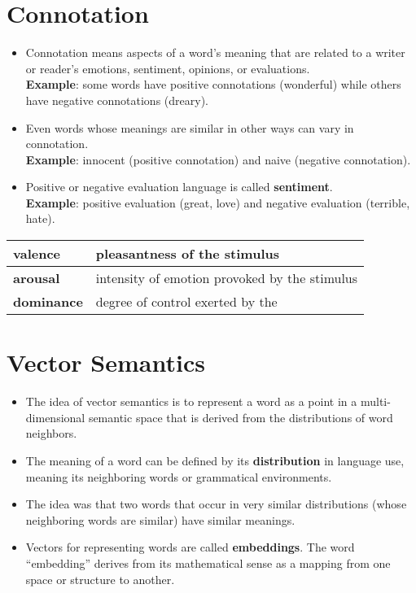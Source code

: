 \section{Connotation \cite{nlp-1}}\label{Connotation}
\begin{itemize}
    \item Connotation means aspects of a word’s meaning that are related to a writer or reader’s emotions, sentiment, opinions, or evaluations.\\
    \textbf{Example}: some words have positive connotations (wonderful) while others have negative connotations (dreary).

    \item Even words whose meanings are similar in other ways can vary in connotation.\\
    \textbf{Example}: innocent (positive connotation) and naive (negative connotation).

    \item Positive or negative evaluation language is called \textbf{sentiment}.\\
    \textbf{Example}: positive evaluation (great, love) and negative evaluation (terrible, hate). 
\end{itemize}

\begin{table}[h!]
    \centering
    \begin{tabular}{|l|p{7cm}|}
        \hline
        \textbf{valence} & pleasantness of the stimulus \\
        \hline
        \textbf{arousal} & intensity of emotion provoked by the stimulus \\
        \hline
        \textbf{dominance} & degree of control exerted by the \\
        \hline
    \end{tabular}
\end{table}

\section{Vector Semantics \cite{nlp-1}}\label{Vector Semantics}
\begin{itemize}
    \item The idea of vector semantics is to represent a word as a point in a multi-dimensional semantic space that is derived from the distributions of word neighbors.

    \item The meaning of a word can be defined by its \textbf{distribution} in language use, meaning its neighboring words or grammatical environments. 

    \item The idea was that two words that occur in very similar distributions (whose neighboring words are similar) have similar meanings.

    \item Vectors for representing words are called \textbf{embeddings}. The word “embedding” derives from its mathematical sense as a mapping from one space or structure to another.

\end{itemize}

